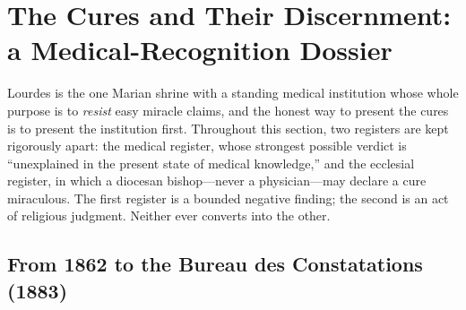 \section{The Cures and Their Discernment: a Medical-Recognition
Dossier}

Lourdes is the one Marian shrine with a standing medical
institution whose whole purpose is to \emph{resist} easy miracle
claims, and the honest way to present the cures is to present the
institution first. Throughout this section, two registers are kept
rigorously apart: the medical register, whose strongest possible
verdict is ``unexplained in the present state of medical
knowledge,'' and the ecclesial register, in which a diocesan
bishop---never a physician---may declare a cure miraculous. The
first register is a bounded negative finding; the second is an act
of religious judgment. Neither ever converts into the other.

\subsection{From 1862 to the Bureau des Constatations (1883)}

